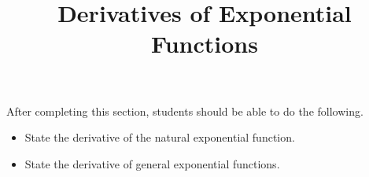 \documentclass{ximera}
\title{Derivatives of Exponential Functions}
\begin{document}
\begin{abstract}
\end{abstract}

\maketitle

\begin{sectionOutcomes}

After completing this section, students should be able to do the following.

\begin{itemize}
	\item State the derivative of the natural exponential function.
	\item State the derivative of general exponential functions.
\end{itemize}

\end{sectionOutcomes}
\end{document}
